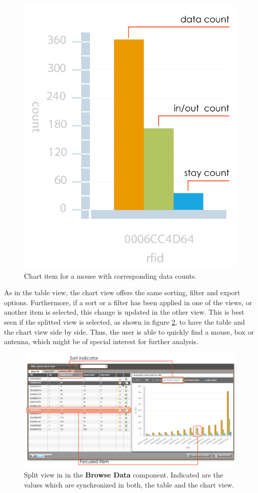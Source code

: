 \begin{figure}[!htbp]
\begin{center}
  \includegraphics[width=.33\textwidth]{assets/pdf/mouse_chart_item.pdf}
  \caption[Chart item for a mouse with corresponding data counts]{Chart item for a mouse with corresponding data counts.}
  \label{fig:mouse_chart_item}
\end{center}
\end{figure}

As in the table view, the chart view offers the same sorting, filter and export options. Furthermore, if a sort or a filter has been applied in one of the views, or another item is selected, this change is updated in the other view. This is best seen if the splitted view is selected, as shown in figure \ref{fig:table_chart_view}, to have the table and the chart view side by side. Thus, the user is able to quickly find a mouse, box or antenna, which might be of special interest for further analysis.

\begin{figure}[htpb]
\begin{center}
  \includegraphics[width=\textwidth]{assets/pdf/table_chart_view.pdf}
  \caption[Split view]{Split view in in the \textbf{Browse Data} component. Indicated are the values which are synchronized in both, the table and the chart view.}
  \label{fig:table_chart_view}
\end{center}
\end{figure}

